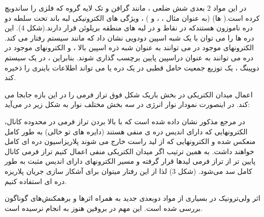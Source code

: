 در این مواد 2 بعدی شش ضلعی ، مانند گرافن و تک لایه گروه  که فلزی را ساندویچ کرده است.( ها) (به عنوان مثال  ،  ،  و ) ، ویژگی های الکترونیکی لبه باند تحت سلطه دو دره ناموزون هستندکه در نقاط  و  در لبه های منطقه بریلوئن  قرار دارند.(شکل 4). این دره ها را می توان با یک شبه اسپین دودویی نشان داد که مانند سیستم  رفتار می کند. الکترونهای موجود در  می توانند به عنوان شبه ذره اسپین بالا ، و الکترونهای موجود در دره  می توانند به عنوان دراسپین پایین برچسب گذاری شوند. بنابراین ، در یک سیستم دوپینگ ، یک توزیع جمعیت حامل قطبی در یک دره  یا  می تواند اطلاعات باینری را ذخیره کند.

اعمال میدان الکتریکی در بخش باریک شکل فوق تراز فرمی را در این بازه جابجا می کند. در اینصورت نمودار نوار انرژی در سه بخش مختلف نوار به شکل زیر در می‌آید:

در مرجع مذکور نشان داده شده است که با بالا بردن تراز فرمی در محدوده کانال، الکترونهایی که دارای اندیس دره ی منفی هستند (دایره های تو خالی) به طور کامل منعکس شده و الکترونهایی که از لید راست خارج می شوند پلاریزاسیون دره ای کامل خواهند داشت. به همین ترتیب اگر میدان الکتریکی منفی اعمال کنیم تراز فرمی کانال پایین تر از تراز فرمی لیدها قرار گرفته و مسیر الکترونهای دارای اندیس مثبت به طور کامل سد می‌شود. (شکل 3)  لذا از این رفتار میتوان برای آشکار سازی جریان پلاریزه دره ای استفاده کنیم.

اثر ولی‌ترونیک در بسیاری از مواد دوبعدی جدید به همراه اثرها و برهمکنش‌های گوناگون بررسی شده است. این مهم در بروفین هنوز به انجام نرسیده است.

